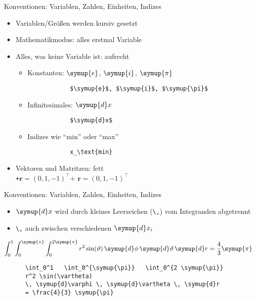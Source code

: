 \begin{frame}[fragile]{Konventionen: Variablen, Zahlen, Einheiten, Indizes}
  \begin{itemize}
    \item Variablen/Größen werden kursiv gesetzt
    \item Mathematikmodus: alles erstmal Variable
    \item Alles, was keine Variable ist: aufrecht
      \begin{itemize}
        \item Konstanten: $\symup{e}$, $\symup{i}$, $\symup{\pi}$
          \smallskip
          \begin{verbatim}
            $\symup{e}$, $\symup{i}$, $\symup{\pi}$
          \end{verbatim}
          \medskip
        \item Infinitesimales: $\symup{d}x$
          \smallskip
          \begin{verbatim}
            $\symup{d}x$
          \end{verbatim}
          \medskip
        \item Indizes wie \enquote{min} oder \enquote{max}
          \smallskip
          \begin{verbatim}
            x_\text{min}
          \end{verbatim}
      \end{itemize}
    \item Vektoren und Matritzen: fett\\
      \texttt+$\symbf{r} = (0, 1, -1)^\top$+ $\symbf{r} = (0, 1, -1)^\top$

  \end{itemize}
\end{frame}

\begin{frame}[fragile]{Konventionen: Variablen, Zahlen, Einheiten, Indizes}
  \begin{itemize}
    \item $\symup{d}x$ wird durch kleines Leerzeichen (\verb+\,+) vom Integranden abgetrennt
    \item \verb+\,+ auch zwischen verschiedenen $\symup{d}x_i$
  \end{itemize}

  \begin{equation*}
    \int_0^1 \int_0^{\symup{\pi}} \int_0^{2 \symup{\pi}}
    r^2 \sin(\vartheta) \,
    \symup{d}\phi \, \symup{d}\vartheta \, \symup{d}r
    = \frac{4}{3} \symup{\pi}
  \end{equation*}

  \vspace{1em}
  \qquad
  \begin{minipage}{0.8\textwidth}
    \begin{verbatim}
      \int_0^1   \int_0^{\symup{\pi}}   \int_0^{2 \symup{\pi}}
      r^2 \sin(\vartheta)
      \, \symup{d}\varphi \, \symup{d}\vartheta \, \symup{d}r
      = \frac{4}{3} \symup{\pi}
    \end{verbatim}
  \end{minipage}
\end{frame}
